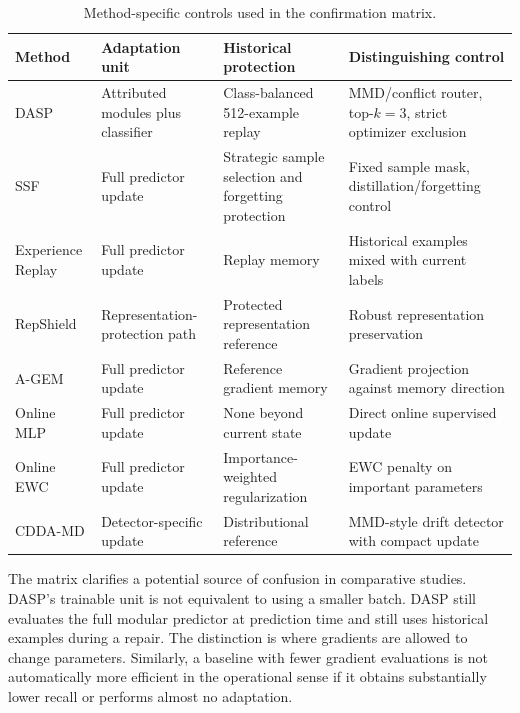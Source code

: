 \begin{table}[t]
\caption{Method-specific controls used in the confirmation matrix.}
\label{tab:method-config-detail}
\centering
\scriptsize
\begin{tabular}{p{}p{}p{}p{}}
\toprule
Method & Adaptation unit & Historical protection & Distinguishing control\\
\midrule
DASP & Attributed modules plus classifier & Class-balanced 512-example replay & MMD/conflict router, top-$k=3$, strict optimizer exclusion\\
SSF & Full predictor update & Strategic sample selection and forgetting protection & Fixed sample mask, distillation/forgetting control\\
Experience Replay & Full predictor update & Replay memory & Historical examples mixed with current labels\\
RepShield & Representation-protection path & Protected representation reference & Robust representation preservation\\
A-GEM & Full predictor update & Reference gradient memory & Gradient projection against memory direction\\
Online MLP & Full predictor update & None beyond current state & Direct online supervised update\\
Online EWC & Full predictor update & Importance-weighted regularization & EWC penalty on important parameters\\
CDDA-MD & Detector-specific update & Distributional reference & MMD-style drift detector with compact update\\
\bottomrule
\end{tabular}
\end{table}

The matrix clarifies a potential source of confusion in comparative studies. DASP's trainable unit is not equivalent to using a smaller batch. DASP still evaluates the full modular predictor at prediction time and still uses historical examples during a repair. The distinction is where gradients are allowed to change parameters. Similarly, a baseline with fewer gradient evaluations is not automatically more efficient in the operational sense if it obtains substantially lower recall or performs almost no adaptation.


